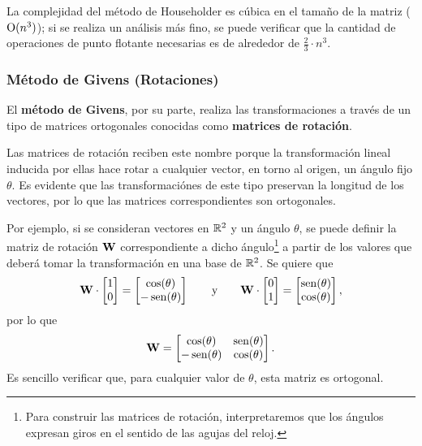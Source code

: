 La complejidad del método de Householder es cúbica en el tamaño de la
matriz ($\mathrm{O}(n^3)$); si se realiza un análisis más fino, se puede verificar
que la cantidad de operaciones de punto flotante necesarias es de alrededor
de $\frac{2}{3} \cdot n^3$.

\subsubsection{Método de Givens (Rotaciones)}
El \textbf{método de Givens}, por su parte, realiza las transformaciones
a través de un tipo de matrices ortogonales conocidas como
\textbf{matrices de rotación}.

Las matrices de rotación reciben este nombre porque la transformación
lineal inducida por ellas hace rotar a cualquier vector, en torno al origen,
un ángulo fijo $\theta$. Es evidente que las transformaciónes de este tipo
preservan la longitud de los vectores, por lo que las matrices
correspondientes son ortogonales.

Por ejemplo, si se consideran vectores en $\mathbb{R}^2$ y un ángulo $\theta$,
se puede definir la matriz de rotación $\mathbf{W}$ correspondiente a dicho
ángulo\footnote{Para construir las matrices de rotación, interpretaremos
que los ángulos expresan giros en el sentido de las agujas del reloj.}
a partir de los valores que deberá tomar la transformación en una base de
$\mathbb{R}^2$.
Se quiere que
\[
\mathbf{W} \cdot \begin{bmatrix} 1 \\ 0 \end{bmatrix} =
    \begin{bmatrix}\cos(\theta) \\ -\operatorname{sen}(\theta) \end{bmatrix}
\qquad \text{y} \qquad
\mathbf{W} \cdot \begin{bmatrix} 0 \\ 1 \end{bmatrix} =
    \begin{bmatrix}\operatorname{sen}(\theta) \\ \cos(\theta) \end{bmatrix},
\]
por lo que
\[
\mathbf{W} = \begin{bmatrix}
    \cos(\theta)   & \operatorname{sen}(\theta) \\
    - \operatorname{sen}(\theta) & \cos(\theta)
\end{bmatrix}.
\]
Es sencillo verificar que, para cualquier valor de $\theta$, esta matriz es
ortogonal.

